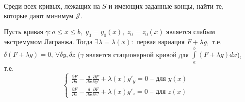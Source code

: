Среди всех кривых, лежащих на $S$ и имеющих заданные концы, найти те, которые дают минимум $\mathcal{J}$.
\begin{theorem}
Пусть кривая $\gamma:a\leqslant x\leqslant b,\; y_0=y_0(x),\;z_0=z_0(x)$ является слабым экстремумом Лагранжа. Тогда $\exists \lambda=\lambda(x):$ первая вариация $F+\lambda g,$ т.е. $\delta(F+\lambda g)=0, \, \forall \delta y, \delta z$ ($\gamma$ является стационарной кривой для $\int\limits_a^b(F+\lambda g)d x$), т.е.
\begin{equation*}
\begin{cases}
\frac{\partial F}{\partial y} - \frac{d}{d x}\frac{\partial F}{\partial y'}+\lambda (x)g'_y=0 \text{ -- для $y(x)$} \\
\frac{\partial F}{\partial z} - \frac{d}{d x}\frac{\partial F}{\partial z'}+\lambda (x)g'_z=0 \text{ -- для $z(x)$}
\end{cases}\end{equation*}
\end{theorem}
